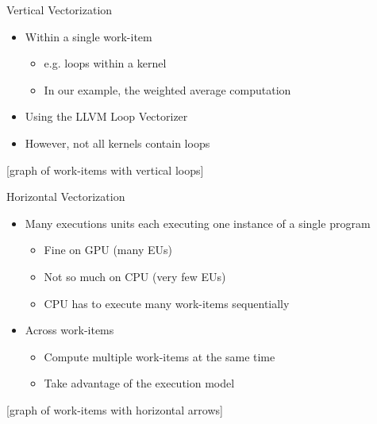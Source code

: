 \begin{frame}{Vertical Vectorization}

\begin{itemize}
    \item Within a single work-item
    \begin{itemize}
        \item e.g. loops within a kernel
        \item In our example, the weighted average computation
        \end{itemize}
    \item Using the LLVM Loop Vectorizer
    \item However, not all kernels contain loops
\end{itemize}

[graph of work-items with vertical loops]

\end{frame}


\begin{frame}{Horizontal Vectorization}

\begin{itemize}
    \item Many executions units each executing one instance of a single program 
    \begin{itemize}
        \item Fine on GPU (many EUs)
        \item Not so much on CPU (very few EUs)
        \item CPU has to execute many work-items sequentially
        \end{itemize}
    
    \item Across work-items
    \begin{itemize}
        \item Compute multiple work-items at the same time
        \item Take advantage of the execution model
    \end{itemize}
\end{itemize}

[graph of work-items with horizontal arrows]

\end{frame}


